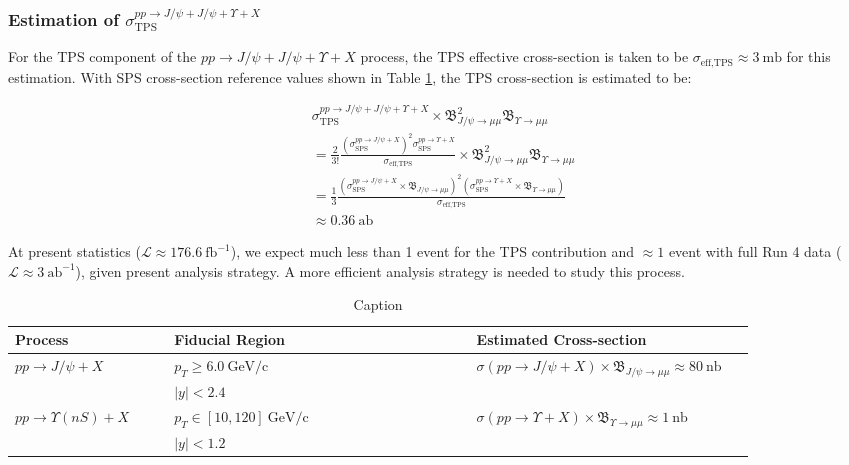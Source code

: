 \documentclass[10pt,twocolumn]{article}
\newcommand*{\effXsecTPS}{\sigma_{\text{eff,TPS}}}
\newcommand*{\GeVc}{~\text{GeV/c}}
\begin{document}
\subsubsection{Estimation of \texorpdfstring{$\sigma_{\text{TPS}}^{pp\to J/\psi+J/\psi+\Upsilon+X}$}{TPS J/psi + J/psi + Upsilon Cross-Section}}

For the TPS component of the $pp\to J/\psi+J/\psi+\Upsilon+X$ process, the TPS effective cross-section is taken to be $\effXsecTPS \approx 3 ~\text{mb}$ for this estimation. With SPS cross-section reference values shown in Table \ref{tab:sps_xsec}, the TPS cross-section is estimated to be:

\begin{equation}
    \begin{aligned}
    & \sigma_{\text{TPS}}^{pp\to J/\psi+J/\psi+\Upsilon+X} \times \mathfrak{B}_{J/\psi\to\mu\mu}^2\mathfrak{B}_{\Upsilon\to\mu\mu} \\
    & = \frac{2}{3!} \frac{\left(\sigma^{pp\to J/\psi+X}_{\text{SPS}}\right)^2\sigma^{pp\to \Upsilon+X}_{\text{SPS}}}{\effXsecTPS}\times \mathfrak{B}_{J/\psi\to\mu\mu}^2\mathfrak{B}_{\Upsilon\to\mu\mu} \\
    & = \frac{1}{3} \frac{\left(\sigma^{pp\to J/\psi+X}_{\text{SPS}}\times \mathfrak{B}_{J/\psi\to\mu\mu}\right)^2\left(\sigma^{pp\to \Upsilon+X}_{\text{SPS}}\times\mathfrak{B}_{\Upsilon\to\mu\mu}\right)}{\effXsecTPS} \\
    & \approx 0.36 ~\text{ab}
    \end{aligned} 
\end{equation}

At present statistics ($\mathcal{L} \approx 176.6 ~\text{fb}^{-1}$), we expect much less than 1 event for the TPS contribution and $\approx 1$ event with full Run 4 data ($\mathcal{L} \approx 3 ~\text{ab}^{-1}$), given present analysis strategy. A more efficient analysis strategy is needed to study this process.

\begin{table}[h!]
    \centering
    \caption{Caption}
    \begin{tabular}{p{0.2\linewidth} p{0.38\linewidth} p{0.35\linewidth}}
    \toprule
        Process & Fiducial Region & Estimated Cross-section \\
    \midrule
        \multirow{2}{\linewidth}{$pp\to J/\psi+X$}&
        $p_T\geq 6.0 \GeVc$ &
        \multirow{2}{\linewidth}{$\sigma(pp\to J/\psi+X) \times \mathfrak{B}_{J/\psi\to\mu\mu} \approx 80 ~\text{nb}$} \\
        & $|y| < 2.4$& \\
        \multirow{2}{\linewidth}{$pp\to \Upsilon(nS) +X$}&
        $p_T\in [10,120] \GeVc$ &
        \multirow{2}{\linewidth}{$\sigma(pp\to \Upsilon+X) \times \mathfrak{B}_{\Upsilon\to\mu\mu} \approx 1~\text{nb}$} \\
        & $|y| < 1.2$& \\
    \bottomrule
    \end{tabular}
    \label{tab:sps_xsec}
\end{table}
\end{document}
